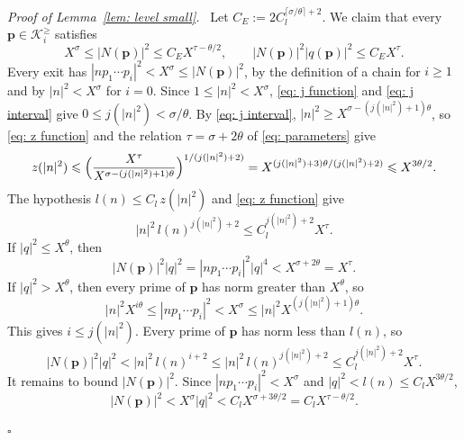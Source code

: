 \documentclass{article}
\numberwithin{equation}{section}
\newenvironment{proof}[1][Proof]{\par\medskip\noindent\textit{#1.}\ }{\hfill$\square$\par\medskip}
\newcommand{\Le}{\leqslant}
\newcommand{\Ge}{\geqslant}
\begin{document}
\begin{proof}[Proof of Lemma~\ref{lem: level small}]
Let $C_E := 2 C_l^{\lceil \sigma/\theta \rceil + 2}$. We claim that every $\boldsymbol{p} \in \mathcal{K}^{\Ge}_i$ satisfies
\begin{equation}
\label{eq: exit bound}
X^{\sigma} \Le |N(\boldsymbol{p})|^2 \Le C_E X^{\tau - \theta/2}, \qquad |N(\boldsymbol{p})|^2 |q(\boldsymbol{p})|^2 \Le C_E X^{\tau}.
\end{equation}
Every exit has $|n p_1 \cdots p_i|^2 < X^{\sigma} \Le |N(\boldsymbol{p})|^2$, by the definition of a chain for $i \Ge 1$ and by $|n|^2 < X^{\sigma}$ for $i = 0$. Since $1 \Le |n|^2 < X^{\sigma}$, \eqref{eq: j function} and \eqref{eq: j interval} give $0 \Le j(|n|^2) < \sigma/\theta$. By \eqref{eq: j interval}, $|n|^2 \Ge X^{\sigma - (j(|n|^2)+1)\theta}$, so \eqref{eq: z function} and the relation $\tau = \sigma + 2\theta$ of \eqref{eq: parameters} give
\begin{equation*}
z(|n|^2) \Le \Bigl( \frac{X^{\tau}}{X^{\sigma - (j(|n|^2)+1)\theta}} \Bigr)^{1/(j(|n|^2)+2)} = X^{(j(|n|^2)+3)\theta/(j(|n|^2)+2)} \Le X^{3\theta/2}.
\end{equation*} The hypothesis $l(n) \Le C_l\, z(|n|^2)$ and \eqref{eq: z function} give
\begin{equation*}
|n|^2\, l(n)^{j(|n|^2)+2} \Le C_l^{j(|n|^2)+2} X^{\tau}.
\end{equation*}
If $|q|^2 \Le X^{\theta}$, then
\begin{equation*}
|N(\boldsymbol{p})|^2 |q|^2 = |n p_1 \cdots p_i|^2 |q|^4 < X^{\sigma + 2\theta} = X^{\tau}.
\end{equation*} If $|q|^2 > X^{\theta}$, then every prime of $\boldsymbol{p}$ has norm greater than $X^{\theta}$, so
\begin{equation*}
|n|^2 X^{i\theta} \Le |n p_1 \cdots p_i|^2 < X^{\sigma} \Le |n|^2 X^{(j(|n|^2)+1)\theta}.
\end{equation*}
This gives $i \Le j(|n|^2)$. Every prime of $\boldsymbol{p}$ has norm less than $l(n)$, so
\begin{equation*}
|N(\boldsymbol{p})|^2 |q|^2 < |n|^2\, l(n)^{i+2} \Le |n|^2\, l(n)^{j(|n|^2)+2} \Le C_l^{j(|n|^2)+2} X^{\tau}.
\end{equation*}
It remains to bound $|N(\boldsymbol{p})|^2$. Since $|n p_1 \cdots p_i|^2 < X^{\sigma}$ and $|q|^2 < l(n) \Le C_l X^{3\theta/2}$,
\begin{equation*}
|N(\boldsymbol{p})|^2 < X^{\sigma}|q|^2 < C_l X^{\sigma + 3\theta/2} = C_l X^{\tau - \theta/2}.
\end{equation*}


\end{proof}
\end{document}

